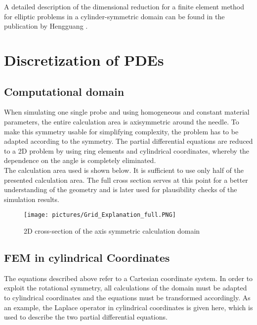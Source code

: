 \documentclass[parskip=half, titlepage=yes, 12pt, BCOR=12mm, DIV=calc]{scrartcl}
\begin{document}
A detailed description of the dimensional reduction for a finite element method for elliptic problems in a cylinder-symmetric domain can be found in the publication by Hengguang \cite{hengguang}.



\section{Discretization of PDEs}

\subsection{Computational domain}

When simulating one single probe and using homogeneous and constant material parameters, the entire calculation area is axisymmetric around the needle. To make this symmetry usable for simplifying complexity, the problem has to be adapted according to the symmetry. The partial differential equations are reduced to a 2D problem by using ring elements and cylindrical coordinates, whereby the dependence on the angle is completely eliminated. \\

The calculation area used is shown below. It is sufficient to use only half of the presented calculation area. The full cross section serves at this point for a better understanding of the geometry and is later used for plausibility checks of the simulation results.

\begin{figure}[H]
    \centering
    \texttt{[image: pictures/Grid\_Explanation\_full.PNG]}
    \caption{2D cross-section of the axis symmetric calculation domain}
    \label{fig:Grid_Explanation_full}
\end{figure}

\subsection{FEM in cylindrical Coordinates}

The equations described above refer to a Cartesian coordinate system. In order to exploit the rotational symmetry, all calculations of the domain must be adapted to cylindrical coordinates and the equations must be transformed accordingly. As an example, the Laplace operator in cylindrical coordinates is given here, which is used to describe the two partial differential equations.
 
\end{document}
